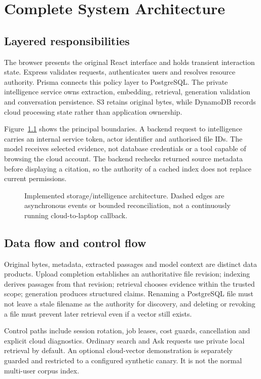 \documentclass[11pt,a4paper,oneside]{report}
\newcommand{\ShortCaption}[1]{\csname ShortCaption#1\endcsname}
\newcommand{\diagram}[3]{\par\begin{figure}[htbp]\centering\sbox{\DiagramBox}{}\ifdim\wd\DiagramBox>\linewidth\resizebox{\linewidth}{!}{\usebox{\DiagramBox}}\else\usebox{\DiagramBox}\fi\caption[\ShortCaption{#1}]{#2}\label{fig:#3}\end{figure}\par}
\begin{document}
\chapter{Complete System Architecture}
\section{Layered responsibilities}
The browser presents the original React interface and holds transient interaction state. Express validates requests, authenticates users and resolves resource authority. Prisma connects this policy layer to PostgreSQL. The private intelligence service owns extraction, embedding, retrieval, generation validation and conversation persistence. S3 retains original bytes, while DynamoDB records cloud processing state rather than application ownership.

Figure~\ref{fig:system} shows the principal boundaries. A backend request to intelligence carries an internal service token, actor identifier and authorised file IDs. The model receives selected evidence, not database credentials or a tool capable of browsing the cloud account. The backend rechecks returned source metadata before displaying a citation, so the authority of a cached index does not replace current permissions.
\diagram{system}{Implemented storage/intelligence architecture. Dashed edges are asynchronous events or bounded reconciliation, not a continuously running cloud-to-laptop callback.}{system}
\section{Data flow and control flow}
Original bytes, metadata, extracted passages and model context are distinct data products. Upload completion establishes an authoritative file revision; indexing derives passages from that revision; retrieval chooses evidence within the trusted scope; generation produces structured claims. Renaming a PostgreSQL file must not leave a stale filename as the authority for discovery, and deleting or revoking a file must prevent later retrieval even if a vector still exists.

Control paths include session rotation, job leases, cost guards, cancellation and explicit cloud diagnostics. Ordinary search and Ask requests use private local retrieval by default. An optional cloud-vector demonstration is separately guarded and restricted to a configured synthetic canary. It is not the normal multi-user corpus index.
\end{document}
